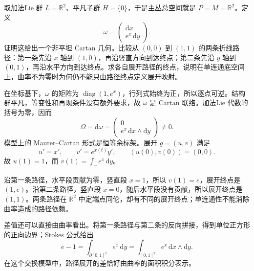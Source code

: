 \begin{exercise}\label{g1:ex:cartan-development-path-dependence}
	取加法Lie 群 \(L=\mathbb R^2\)、平凡子群 \(H=\{0\}\)，于是主丛总空间就是 \(P=M=\mathbb R^2\)。定义
	\[
		\omega=\begin{pmatrix}\mathrm{d}x\\e^x\,\mathrm{d}y\end{pmatrix}.
	\]
	证明这给出一个非平坦 Cartan 几何。比较从 \((0,0)\) 到 \((1,1)\) 的两条折线路径：第一条先沿 \(x\) 轴到 \((1,0)\)，再沿竖直方向到达终点；第二条先沿 \(y\) 轴到 \((0,1)\)，再沿水平方向到达终点。求各自展开路径的终点，说明在单连通底空间上，曲率不为零时为何仍不能只由路径终点定义展开映射。
\end{exercise}
\begin{solution}
	在坐标基下，\(\omega\) 的矩阵为 \(\operatorname{diag}(1,e^x)\)，行列式始终为正，所以逐点可逆。结构群平凡，等变性和再现条件没有额外要求，故 \(\omega\) 是 Cartan 联络。加法Lie 代数的括号为零，因而
	\[
		\Omega=\mathrm{d}\omega
		=\begin{pmatrix}0\\e^x\,\mathrm{d}x\wedge\mathrm{d}y\end{pmatrix}\ne0.
	\]
	模型上的 Maurer--Cartan 形式是恒等余标架。展开 \(g=(u,v)\) 满足
	\[
		u'=x',\qquad v'=e^{x(t)}y',\qquad
		(u(0),v(0))=(0,0).
	\]
	故 \(u(1)=1\)，而 \(v(1)=\int_\gamma e^x\,\mathrm{d}y\)。

	沿第一条路径，水平段贡献为零，竖直段 \(x=1\)，所以 \(v(1)=e\)，展开终点是 \((1,e)\)。沿第二条路径，竖直段 \(x=0\)，随后水平段没有贡献，所以展开终点是 \((1,1)\)。两条路径在 \(\mathbb R^2\) 中定端点同伦，却有不同的展开终点；单连通性不能消除曲率造成的路径依赖。

	差值还可以直接由曲率看出。将第一条路径与第二条的反向拼接，得到单位正方形的正向边界；Stokes 公式给出
	\[
		e-1
		=\int_{\partial[0,1]^2}e^x\,\mathrm{d}y
		=\int_{[0,1]^2}e^x\,\mathrm{d}x\wedge\mathrm{d}y.
	\]
	在这个交换模型中，路径展开的差恰好由曲率的面积积分表示。
\end{solution}

